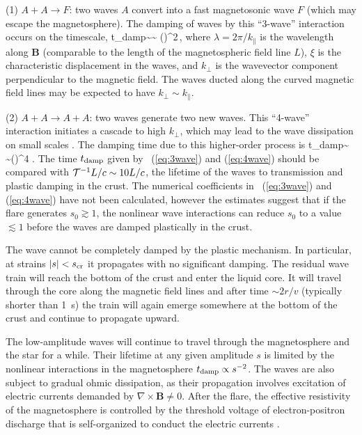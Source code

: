 \noindent
(1) $A+A\rightarrow F$: two \alfven waves $A$ convert into a fast magnetosonic 
wave $F$ (which may escape the magnetosphere). 
The damping of \alfven waves by this ``3-wave'' interaction occurs on the timescale,
\beq
\label{eq:3wave}
  t_{\rm damp}\sim {}\sim 
   \left(\right)^2\,,
\eeq
where $\lambda=2\pi/k_\parallel$ is the wavelength along ${\mathbf B}$ (comparable to the length of the magnetospheric field line $L$), $\xi$ is the characteristic displacement in the waves, and $k_\perp$ is the wavevector component perpendicular to the magnetic field. 
The \alfven waves ducted along the curved magnetic field lines may be 
expected to have $k_\perp\sim k_\parallel$.
  
 \noindent
(2)  $A+A\rightarrow A+A$:  two \alfven waves generate two new \alfven waves. 
This ``4-wave'' interaction initiates a cascade to high $k_\perp$, which may lead to the wave dissipation on small scales \citep{1998PhRvD..57.3219T}.
The damping time due to this higher-order process is 
\beq
 \label{eq:4wave}
  t_{\rm damp}\sim {}
     \sim  \left(\right)^4 .
\eeq
The time $t_{\rm damp}$ given by \Eqs~(\ref{eq:3wave}) and (\ref{eq:4wave}) should be compared with ${\mathcal T}^{-1}L/c\sim 10 L/c$, the lifetime of the \alfven waves to transmission and plastic damping in the crust. 
The numerical coefficients in \Eqs~(\ref{eq:3wave}) and (\ref{eq:4wave}) have not been calculated, however the estimates suggest that if the flare generates $s_0\gtrsim 1$, the nonlinear wave interactions can reduce $s_0$ to a value $\lesssim 1$ before the waves are damped plastically in the crust.
 
The wave cannot be completely damped by the plastic mechanism. 
In particular, at strains $|s|<s_{\rm cr}$ it propagates with no significant damping. 
The residual wave train will reach the bottom of the crust and enter the liquid core. 
It will travel through the core along the magnetic field lines and after time $\sim 2r/v$ (typically shorter than 1~s) the train will again emerge somewhere at the bottom of the crust and continue to propagate upward.

The low-amplitude waves will continue to travel through the magnetosphere and the star for a while. Their lifetime at any given amplitude $s$ is limited by the nonlinear interactions in the magnetosphere $t_{\rm damp}\propto s^{-2}$. 
The \alfven waves are also subject to gradual ohmic dissipation, as their propagation involves excitation of electric currents demanded by $\nabla\times{\mathbf B}\neq 0$.
After the flare, the effective resistivity of the magnetosphere is controlled by the threshold voltage of electron-positron discharge that is self-organized to conduct the electric currents \citep{2007ApJ...657..967B}.

